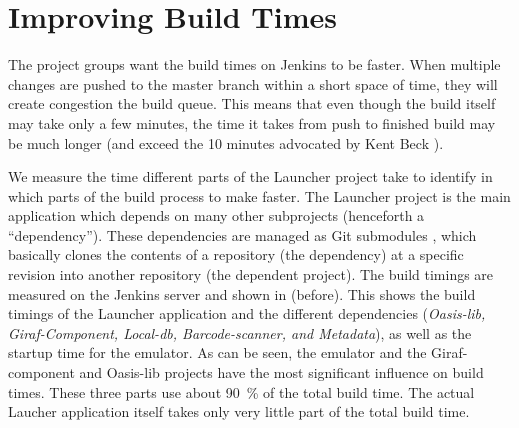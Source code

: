 \chapter{Improving Build Times}
The project groups want the build times on Jenkins to be faster. When multiple changes are pushed to the master branch within a short space of time, they will create congestion the build queue. This means that even though the build itself may take only a few minutes, the time it takes from push to finished build may be much longer (and exceed the 10 minutes advocated by Kent Beck \parencite{beck2004}).

We measure the time different parts of the Launcher project take to identify in which parts of the build process to make faster. The Launcher project is the main application which depends on many other subprojects (henceforth a ``dependency''). These dependencies are managed as Git submodules \parencite{git-submodules-doc}, which basically clones the contents of a repository (the dependency) at a specific revision into another repository (the dependent project). The build timings are measured on the Jenkins server and shown in  (before). This shows the build timings of the Launcher application and the different dependencies (\emph{Oasis-lib, Giraf-Component, Local-db, Barcode-scanner, and Metadata}), as well as the startup time for the emulator. As can be seen, the emulator and the Giraf-component and Oasis-lib projects have the most significant influence on build times. These three parts use about \SI{90}{\percent} of the total build time. The actual Laucher application itself takes only very little part of the total build time.

